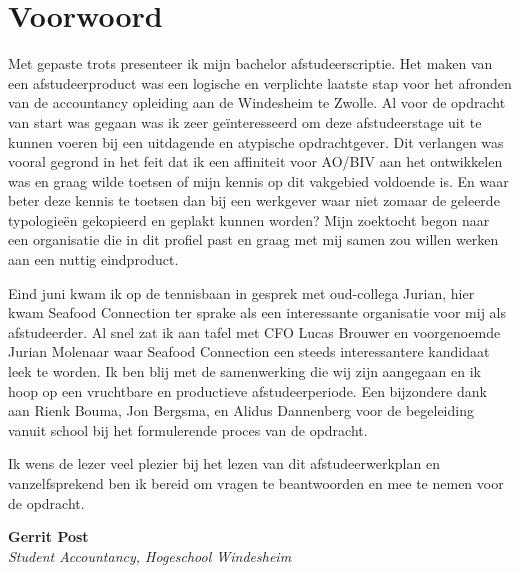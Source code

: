 \chapter*{Voorwoord} %
\thispagestyle{empty} %
\BgThispage %
Met gepaste trots presenteer ik mijn bachelor afstudeerscriptie. Het maken van een afstudeerproduct was een logische en verplichte laatste stap voor het afronden van de accountancy opleiding aan de Windesheim te Zwolle. Al voor de opdracht van start was gegaan was ik zeer geïnteresseerd om deze afstudeerstage uit te kunnen voeren bij een uitdagende en atypische opdrachtgever. Dit verlangen was vooral gegrond in het feit dat ik een affiniteit voor AO/BIV aan het ontwikkelen was en graag wilde toetsen of mijn kennis op dit vakgebied voldoende is. En waar beter deze kennis te toetsen dan bij een werkgever waar niet zomaar de geleerde typologieën gekopieerd en geplakt kunnen worden?
Mijn zoektocht begon naar een organisatie die in dit profiel past en graag met mij samen zou willen werken aan een nuttig eindproduct.

Eind juni kwam ik op de tennisbaan in gesprek met oud-collega Jurian, hier kwam Seafood Connection ter sprake als een interessante organisatie voor mij als afstudeerder. Al snel zat ik aan tafel met CFO Lucas Brouwer en voorgenoemde Jurian Molenaar waar Seafood Connection een steeds interessantere kandidaat leek te worden. Ik ben blij met de samenwerking die wij zijn aangegaan en ik hoop op een vruchtbare en productieve afstudeerperiode. Een bijzondere dank aan Rienk Bouma, Jon Bergsma, en Alidus Dannenberg voor de begeleiding vanuit school bij het formulerende proces van de opdracht. 

Ik wens de lezer veel plezier bij het lezen van dit afstudeerwerkplan en vanzelfsprekend ben ik bereid om vragen te beantwoorden en mee te nemen voor de opdracht.

\bigskip
\noindent
\textbf{Gerrit Post} \\
\textit{Student Accountancy, Hogeschool Windesheim}
